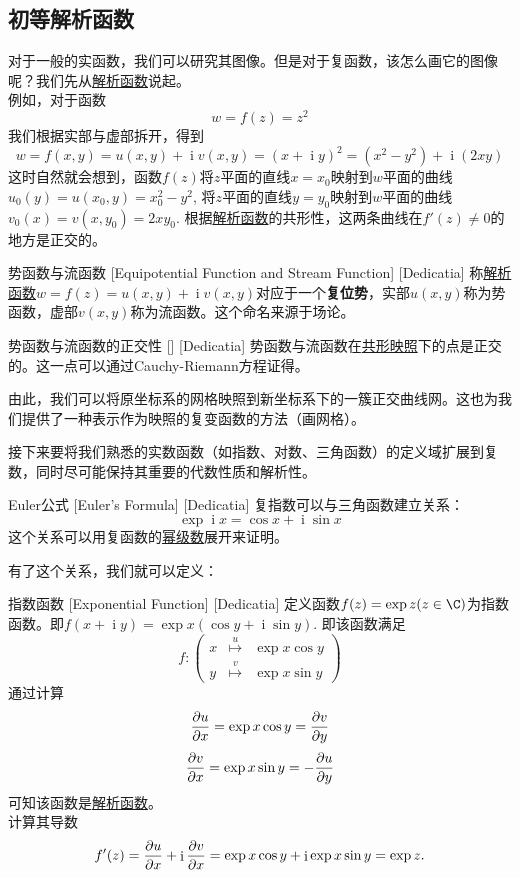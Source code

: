 \documentclass[UTF8]{ctexart}
\DeclareMathOperator{\ii}{\mathrm{i}}
\newcommand{\AnalyticalFunction}{\hyperref[dfn:AnalyticalFunction]{解析函数}}
\newcommand{\PowerSeries}{\hyperref[dfn:PowerSeries]{幂级数}}
\newcommand{\ConformalMapping}{\hyperref[dfn:ConformalMapping]{共形映照}}
\begin{document}
\subsection{初等解析函数}
对于一般的实函数，我们可以研究其图像。但是对于复函数，该怎么画它的图像呢？我们先从\AnalyticalFunction 说起。\\
例如，对于函数
\[w=f(z)=z^2\]
我们根据实部与虚部拆开，得到
\[w=f(x,y)=u(x,y)+\ii v(x,y)=(x+\ii y)^2=(x^2-y^2)+\ii(2xy)\]
这时自然就会想到，函数$f(z)$将$z$平面的直线$x=x_0$映射到$w$平面的曲线$u_0(y)=u(x_0,y)=x_0^2-y^2$, 将$z$平面的直线$y=y_0$映射到$w$平面的曲线$v_0(x)=v(x,y_0)=2xy_0$. 根据\AnalyticalFunction 的共形性，这两条曲线在$f'(z)\neq 0$的地方是正交的。
\begin{dfn}
    [UUID]
    {势函数与流函数}
    [Equipotential Function and Stream Function]
    [Dedicatia]
    称\AnalyticalFunction $w=f(z)=u(x,y)+\ii v(x,y)$对应于一个\textbf{复位势}，实部$u(x,y)$称为势函数，虚部$v(x,y)$称为流函数。这个命名来源于场论。
\end{dfn}
\begin{ppt}
    [UUID]
    {势函数与流函数的正交性}
    []
    [Dedicatia]
    势函数与流函数在\ConformalMapping 下的点是正交的。这一点可以通过Cauchy-Riemann方程证得。
\end{ppt}
由此，我们可以将原坐标系的网格映照到新坐标系下的一簇正交曲线网。这也为我们提供了一种表示作为映照的复变函数的方法（画网格）。\par
接下来要将我们熟悉的实数函数（如指数、对数、三角函数）的定义域扩展到复数，同时尽可能保持其重要的代数性质和解析性。
\begin{thm}
    [UUID]
    {Euler公式}
    [Euler's Formula]
    [Dedicatia]
    复指数可以与三角函数建立关系：
    \[\exp \ii x=\cos x+\ii\sin x\]
    这个关系可以用复函数的\PowerSeries 展开来证明。
\end{thm}
有了这个关系，我们就可以定义：
\begin{dfn}
    [UUID]
    {指数函数}
    [Exponential Function]
    [Dedicatia]
    定义函数$f(z)=\exp z (z\in\C)$为指数函数。即$f(x+\ii y)=\exp x(\cos y+\ii\sin y)$. 即该函数满足
    \[f:\begin{pmatrix}
        x&\overset{u}{\mapsto}&\exp x\cos y\\
        y&\overset{v}{\mapsto}&\exp x\sin y
    \end{pmatrix}\]
    通过计算
    \[\pdv{u}{x}=\exp x\cos y=\pdv{v}{y}\]
    \[\pdv{v}{x}=\exp x\sin y=-\pdv{u}{y}\]
    可知该函数是\AnalyticalFunction 。\\
    计算其导数
    \[f'(z)=\pdv{u}{x}+\ii\pdv{v}{x}=\exp x\cos y+\ii\exp x\sin y=\exp z.\]
\end{dfn}
\end{document}

